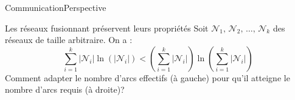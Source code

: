 \begin{frame}{Communication}{Perspective}

  \begin{block}{Les réseaux fusionnant préservent leurs propriétés}
    Soit $\mathcal{N}_1,\, \mathcal{N}_2,\, \ldots ,\, \mathcal{N}_k$ des réseaux
    de taille arbitraire. On a : \vspace{-5pt}
    \begin{equation}
      \sum\limits_{i = 1}^k |\mathcal{N}_i|\ln (|\mathcal{N}_i|) < (\sum\limits_{i = 1}^k |\mathcal{N}_i|)\ln{(\sum\limits_{i=1}^k |\mathcal{N}_i|)}
    \end{equation}
    Comment adapter le nombre d'arcs effectifs (à gauche) pour qu'il atteigne le
    nombre d'arcs requis (à droite)?
  \end{block}


\end{frame}
